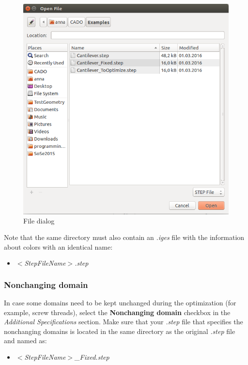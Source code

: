 \documentclass[
12pt, %
a4paper, %
oneside, %
headinclude,footinclude, %
BCOR5mm, %
]{scrartcl}
\begin{document}
\begin{figure}
\centering
\includegraphics[scale=0.4]{Pictures/chooseFileDialog.png}
\caption{File dialog}
\label{fig:fileDialog}
\end{figure} 

Note that the same directory must also contain an \textit{.iges} file with the information about colors with an identical name:
\begin{itemize}
\item[] \textit{$<$StepFileName$>$.step}
\end{itemize}

\subsubsection{Nonchanging domain}
In case some domains need to be kept unchanged during the optimization (for example, screw threads), select the \textbf{Nonchanging domain} checkbox in the \textit{Additional Specifications} section. Make sure that your \textit{.step} file that specifies the nonchanging domains is located in the same directory as the original \textit{.step} file and named as:
\begin{itemize}
\item[] \textit{$<$StepFileName$>${\_}Fixed.step}
\end{itemize}
\end{document}
